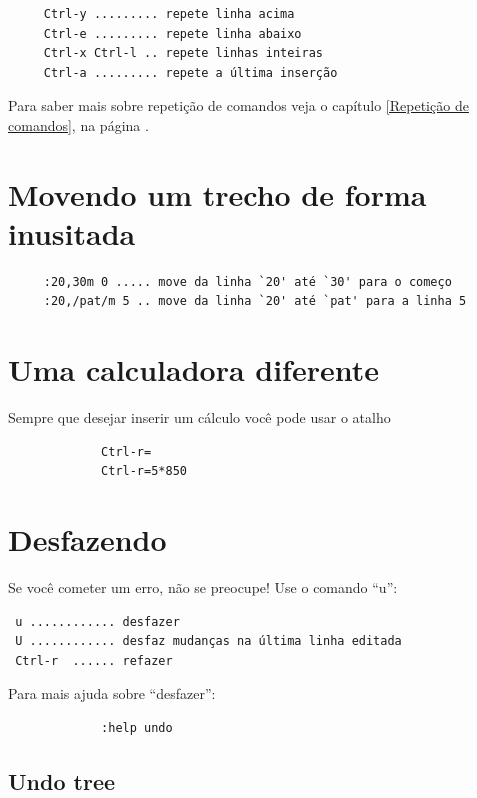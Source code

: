 \documentclass[10pt,a4paper,openany]{book}
\begin{document}
\begin{verbatim}
	 Ctrl-y ......... repete linha acima
	 Ctrl-e ......... repete linha abaixo
	 Ctrl-x Ctrl-l .. repete linhas inteiras
	 Ctrl-a ......... repete a última inserção
\end{verbatim}

Para saber mais sobre repetição de comandos veja o capítulo \ref{Repetição de comandos},
na página \pageref{Repetição de comandos}.

\section{Movendo um trecho de forma inusitada}
\label{Movendo um trecho de forma inusitada}

\begin{verbatim}
	 :20,30m 0 ..... move da linha `20' até `30' para o começo
	 :20,/pat/m 5 .. move da linha `20' até `pat' para a linha 5
\end{verbatim}


\section{Uma calculadora diferente}
\label{Uma calculadora diferente}
Sempre que desejar inserir um cálculo você pode usar o atalho

\begin{verbatim}
			 Ctrl-r=
			 Ctrl-r=5*850
\end{verbatim}


\section{Desfazendo}
\label{Desfazendo}

Se você cometer um erro, não se preocupe! Use o comando ``u'':

\begin{verbatim}
 u ............ desfazer
 U ............ desfaz mudanças na última linha editada
 Ctrl-r  ...... refazer
\end{verbatim}

Para mais ajuda sobre ``desfazer'':

\begin{verbatim}
			 :help undo
\end{verbatim}

\subsection{Undo tree}
\label{Undo tree}
\end{document}
